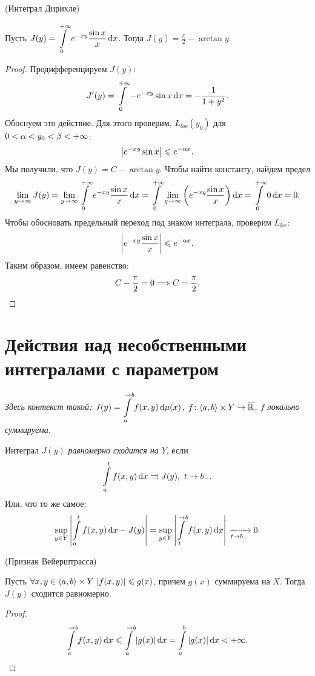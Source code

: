 \begin{example}(Интеграл Дирихле)

    Пусть $\displaystyle J(y) = \intl_0^{+\infty}{e^{-xy} \frac{\sin{x}}{x} \dd x}$. Тогда
    $\displaystyle J(y) = \frac{\pi}{2} - \arctan{y}$.
\end{example}
\begin{proof}
    Продифференцируем $J(y)$:
    \[
        J'(y) = \intl_0^{+\infty}{-e^{-xy} \sin{x} \dd x} = -\frac{1}{1 + y^2}
    .\]
    Обоснуем это действие. Для этого проверим, $L_{loc}(y_0)$ для $0 < \a < y_0 < \b < +\infty$:
    \[
        \abs*{e^{-xy} \sin{x}} \leqslant e^{-\a x}
    .\]
    Мы получили, что $J(y) = C - \arctan{y}$. Чтобы найти константу, найдем предел
    \[
        \lim_{y \to \infty}{J(y)} = \lim_{y \to \infty}{\intl_0^{+\infty}{e^{-xy} \frac{\sin{x}}{x} \dd x}} =
        \intl_0^{+\infty}{\lim_{y \to \infty}{\parens*{e^{-xy} \frac{\sin{x}}{x}}} \dd x} =
        \intl_0^{+\infty}{0 \dd x} = 0
    .\]
    Чтобы обосновать предельный переход под знаком интеграла, проверим $L_{loc}$:
    \[
        \abs*{e^{-xy} \frac{\sin{x}}{x}} \leqslant e^{-\a x}
    .\]
    Таким образом, имеем равенство:
    \[
        C - \frac{\pi}{2} = 0 \Lra C = \frac{\pi}{2}
    .\]
\end{proof}

\section{Действия над несобственными интегралами с параметром}

\textit{Здесь контекст такой: $\displaystyle J(y) = \intl_a^{\to b}{f(x, y) \dd \mu(x)}$,
$f \colon \langle a, b \rangle \times Y \to \Rbar$, $f$ локально суммируема.}

\begin{definition}
    Интеграл $J(y)$ \textit{равномерно сходится на $Y$}, если
    \[
        \intl_a^t{f(x, y) \dd x} \rcon J(y),~ t \to b_-
    .\]
    Или, что то же самое:
    \[
        \sup_{y \in Y}{\abs*{\intl_a^t{f(x, y) \dd x} - J(y)}} =
        \sup_{y \in Y}{\abs*{\intl_t^{\to b}{f(x, y) \dd x}}} \xrightarrow[t \to b_-]{} 0
    .\]
\end{definition}

\begin{theorem}(Признак Вейерштрасса)

    Пусть $\forall x, y \in \langle a, b \rangle \times Y~ \abs*{f(x, y)} \leqslant g(x)$, причем
    $g(x)$ суммируема на $X$. Тогда $J(y)$ сходится равномерно.
\end{theorem}
\begin{proof}
    \[
        \intl_a^{\to b}{f(x, y) \dd x} \leqslant \intl_a^{\to b}{|g(x)| \dd x} =
        \intl_a^b{|g(x)| \dd x} < +\infty
    .\]
\end{proof}


